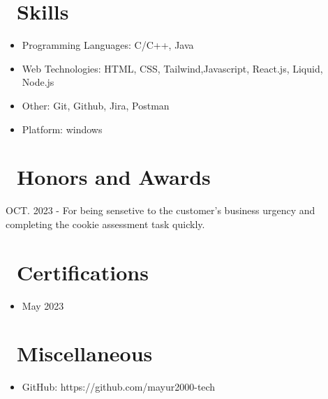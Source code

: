 \documentclass{resume}
\begin{document}
\section{\faCogs\ Skills}
\begin{itemize}[parsep=0.5ex]
  \item Programming Languages: C/C++, Java
  \item Web Technologies: HTML, CSS, Tailwind,Javascript,  React.js, Liquid, Node.js
  \item Other: Git, Github, Jira, Postman
  \item Platform: windows
\end{itemize}
 
\section{\faHeartO\ Honors and Awards}
 {OCT. 2023}
- For being sensetive to the customer's business urgency and completing the cookie assessment task quickly.

 
\section{\faGraduationCap\ Certifications}
\begin{itemize}[parsep=0.5ex]
    \item {}
{May 2023}
\end{itemize}
 
 
\section{\faInfo\ Miscellaneous}
\begin{itemize}[parsep=0.5ex]
  \item GitHub: https://github.com/mayur2000-tech
\end{itemize}
 
%
%
\end{document}

